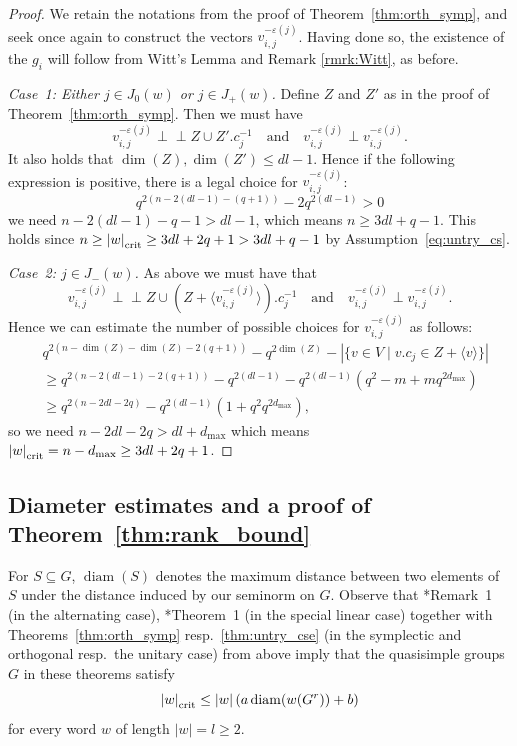 \documentclass[a4paper,12pt]{amsproc}
\newcommand{\norm}[1]{\left\lvert#1\right\rvert}%
\newcommand{\card}[1]{\left\lvert#1\right\rvert}%
\newcommand{\perpnotin}{\mathrel{\perp\!\!\!\perp}}%
\DeclareMathOperator{\diam}{diam}%
\theoremstyle{plain}
\theoremstyle{definition}
\begin{document}
\begin{proof}
We retain the notations from the proof of Theorem~\ref{thm:orth_symp}, 
and seek once again to construct the vectors $v_{i,j}^{-\varepsilon(j)}$. 
Having done so, the existence of the $g_i$ will follow from Witt's Lemma 
and Remark \ref{rmrk:Witt}, as before.

\emph{Case~1: Either $j\in J_0(w)$ or $j\in J_+(w)$.} Define $Z$ and $Z'$ as in the proof of Theorem~\ref{thm:orth_symp}. Then we must have
$$
v_{i,j}^{-\varepsilon(j)}\perpnotin Z\cup Z'.c_j^{-1}\quad\text{and}\quad v_{i,j}^{-\varepsilon(j)}\perp            v_{i,j}^{-\varepsilon(j)}.
$$
It also holds that $\dim(Z),\dim(Z')\leq dl-1$. Hence if the following expression is positive, there is a legal choice for $v_{i,j}^{-\varepsilon(j)}$:
$$
q^{2(n-2(dl-1)-(q+1))}-2q^{2(dl-1)}>0
$$
we need $n-2(dl-1)-q-1>dl-1$, which means $n\geq 3dl+q-1$. This holds since $n\geq\norm{w}_{\rm crit}\geq 3dl+2q+1>3dl+q-1$ by Assumption~\eqref{eq:untry_cs}.
		
\vspace{3mm}
		
\noindent\emph{Case~2: $j\in J_-(w)$.} As above we must have that
$$
v_{i,j}^{-\varepsilon(j)}\perpnotin Z\cup (Z+\langle v_{i,j}^{-\varepsilon(j)}\rangle).c_j^{-1}\quad\text{and}\quad v_{i,j}^{-\varepsilon(j)}\perp v_{i,j}^{-\varepsilon(j)}.
$$ 
Hence we can estimate the number of possible choices for $v_{i,j}^{-\varepsilon(j)}$ as follows:
\begin{align*}
& q^{2(n-\dim(Z)-\dim(Z)-2(q+1))}-q^{2\dim(Z)}-\card{\{v\in V \mid v.c_j\in Z+\langle v\rangle\}}\\
& \geq q^{2(n-2(dl-1)-2(q+1))}-q^{2(dl-1)}-q^{2(dl-1)}(q^2-m+mq^{2d_{\max}})\\
&\geq q^{2(n-2dl-2q)}-q^{2(dl-1)}(1+q^2 q^{2d_{\max}}),
\end{align*}
so we need $n-2dl-2q>dl+d_{\max}$ which means $\norm{w}_{\rm crit}=n-d_{\max}\geq 3dl+2q+1$.
\end{proof}
	
\subsection{Diameter estimates and a proof of Theorem~\ref{thm:rank_bound}}

For $S\subseteq G$, $\diam(S)$ denotes the maximum distance between two elements of $S$ under the distance induced by our seminorm on $G$. Observe that \cite{schneiderthom2022word}*{Remark~1} (in the alternating case), \cite{bradfordschneiderthom2023non}*{Theorem~1} (in the special linear case) together with Theorems~\ref{thm:orth_symp} resp.~\ref{thm:untry_cse} (in the symplectic and orthogonal resp.\ the unitary case) from above imply that the quasisimple groups $G$ in these theorems satisfy
\begin{equation}\label{eq:ineq}
\norm{w}_{\rm crit}\leq\norm{w}(a\diam(w(G^r))+b)
\end{equation}
for every word $w$ of length $\norm{w}=l\geq 2$. 
\end{document}
